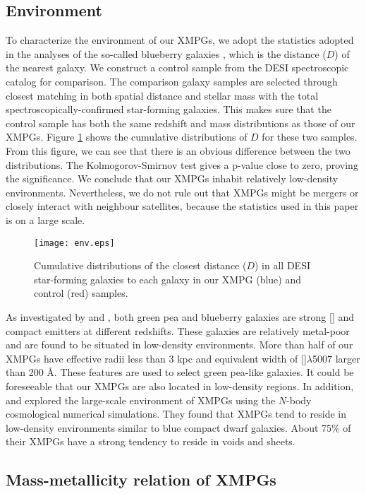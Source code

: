 \documentclass[twocolumn]{aastex631}
\newcommand{\OIII}{[\mbox{\ion{O}{3}}]}   %
\newcommand{\OIIIFIZ}{[\mbox{\ion{O}{3}}]$\lambda$5007}
\begin{document}
\subsection{Environment} \label{sec:env}
To characterize the environment of our XMPGs, we adopt the statistics adopted in the analyses of the so-called blueberry galaxies \citep{Yan17}, which is the distance ($D$) of the nearest galaxy. We construct a control sample from the DESI spectroscopic catalog for comparison. The comparison galaxy samples are selected through closest matching in both spatial distance and stellar mass with the total spectroscopically-confirmed star-forming galaxies. This makes sure that the control sample has both the same redshift and mass distributions as those of our XMPGs. Figure \ref{fig:env} shows the cumulative distributions of $D$ for these two samples. From this figure, we can see that there is an obvious difference between the two distributions. The Kolmogorov-Smirnov test gives a p-value close to zero, proving the significance. We conclude that our XMPGs inhabit relatively low-density environments. Nevertheless, we do not rule out that XMPGs might be mergers or closely interact with neighbour satellites, because the statistics used in this paper is on a large scale.
 \begin{figure}[tbh!]
\centering
\texttt{[image: env.eps]}
\caption{Cumulative distributions of the closest distance ($D$) in all DESI star-forming galaxies to each galaxy in our XMPG (blue) and control (red) samples. \label{fig:env}}
\end{figure}

As investigated by \citet{Car09} and \citet{Yan17}, both green pea and blueberry galaxies are strong {\OIII} and compact emitters at different redshifts. These galaxies are relatively metal-poor and are found to be situated in low-density environments. More than half of our XMPGs have effective radii less than 3 kpc and equivalent width of {\OIIIFIZ} larger than 200 \AA. These features are used to select green pea-like galaxies. It could be foreseeable that our XMPGs are also located in low-density regions. In addition, \citet{Fil15} and \citet{San16a} explored the large-scale environment of XMPGs using the $N$-body cosmological numerical simulations. They found that XMPGs tend to reside in low-density environments similar to blue compact dwarf galaxies. About 75\% of their XMPGs have a strong tendency to reside in voids and sheets. 

\subsection{Mass-metallicity relation of XMPGs} \label{sec:relation}
\end{document}
